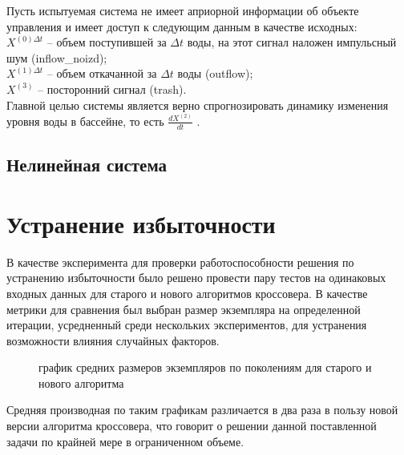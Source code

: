 \documentclass[utf8,usehyperref,12pt]{G7-32}
\begin{document}
Пусть испытуемая система не имеет априорной информации об объекте управления и имеет доступ к следующим данным в качестве исходных:\\
$ X^{(0) \Delta t} $ – объем поступившей за $ \Delta t $ воды, на этот сигнал наложен импульсный шум (inflow\_noizd);\\
$ X^{(1) \Delta t} $ – объем откачанной за $ \Delta t $ воды (outflow);\\
$ X^{(3)} $ – посторонний сигнал (trash).\\
Главной целью системы является верно спрогнозировать динамику изменения уровня воды в бассейне, то есть $ \frac{dX^{(2)}}{dt} $ .
\subsection{Нелинейная система}


\section{Устранение избыточности}
В качестве эксперимента для проверки работоспособности решения по устранению избыточности было решено провести пару тестов на одинаковых входных данных для старого и нового алгоритмов кроссовера. В качестве метрики для сравнения был выбран размер экземпляра на определенной итерации, усредненный среди нескольких экспериментов, для устранения возможности влияния случайных факторов.
\begin{figure}[H]
 \caption{график средних размеров экземпляров по поколениям для старого и нового алгоритма}\label{cross_diff}
\end{figure}
Средняя производная по таким графикам различается в два раза в пользу новой версии алгоритма кроссовера, что говорит о решении данной поставленной задачи по крайней мере в ограниченном объеме.
\end{document}
